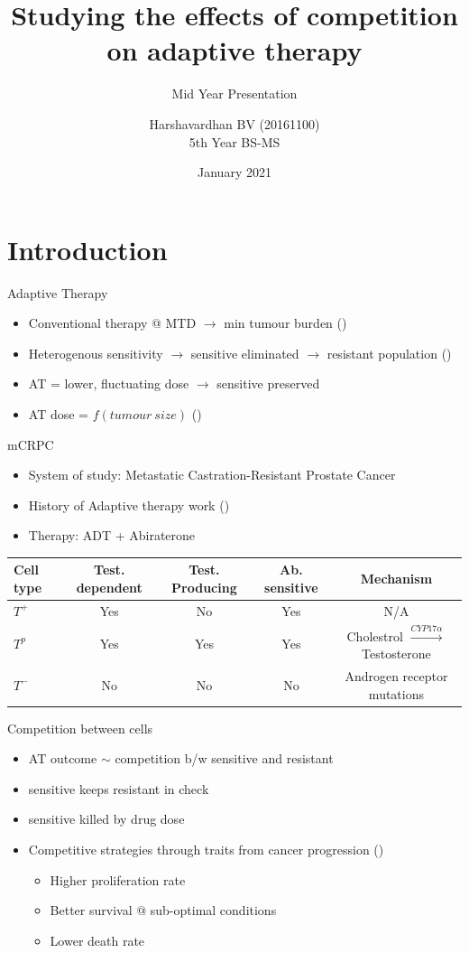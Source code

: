\documentclass[aspectratio=169,9pt]{beamer}
\title{Studying the effects of competition on adaptive therapy}
\subtitle{Mid Year Presentation}
\author{Harshavardhan BV (20161100)\\ 5th Year BS-MS}
\date{January 2021}
\institute{Under the guidance of Prof. Sutirth Dey,\\ IISER Pune}
\begin{document}
\frame{\titlepage}

\section{Introduction}
\begin{frame}{Adaptive Therapy}
  \begin{itemize}
    \item Conventional therapy @ MTD $\rightarrow$ min tumour burden (\cite{Frei})
    \item Heterogenous sensitivity $\rightarrow$ sensitive eliminated $\rightarrow$ resistant population (\cite{Scott})
    \item AT = lower, fluctuating dose $\rightarrow$ sensitive preserved
    \item AT dose = $f(tumour\ size)$ (\cite{Gatenby})
  \end{itemize}
\end{frame}

\begin{frame}{mCRPC}
  \begin{itemize}
    \item System of study: Metastatic Castration-Resistant Prostate Cancer
    \item History of Adaptive therapy work (\cite{Cunningham})
    \item Therapy: ADT + Abiraterone
  \end{itemize}
  \begin{table}
    \centering
    \begin{tabular}{|l|c|c|c|c|}
    \hline
    Cell type & Test. dependent & Test. Producing & Ab. sensitive & Mechanism \\
    \hline
    $T^+$ & Yes & No & Yes & N/A \\
    $T^p$ & Yes & Yes & Yes & Cholestrol $\xrightarrow{CYP17\alpha}$ Testosterone\\
    $T^-$ & No & No & No & Androgen receptor mutations\\
    \hline
    \end{tabular}
  \end{table}
\end{frame}

\begin{frame}{Competition between cells}
  \begin{itemize}
    \item AT outcome $\sim$ competition b/w sensitive and resistant
    \item sensitive keeps resistant in check
    \item sensitive killed by drug dose
    \item Competitive strategies through traits from cancer progression (\cite{Hanahan})
    \begin{itemize}
      \item Higher proliferation rate
      \item Better survival @ sub-optimal conditions
      \item Lower death rate
    \end{itemize}
  \end{itemize}
\end{frame}
\end{document}
